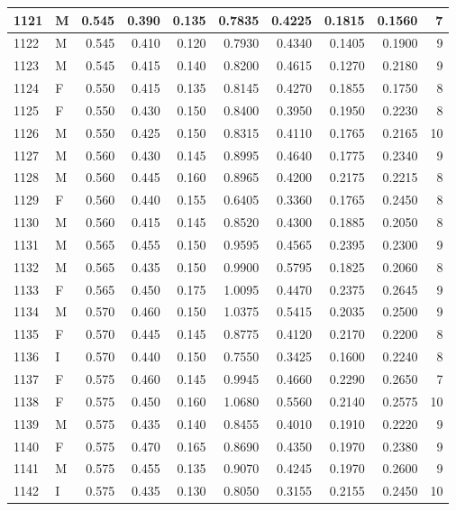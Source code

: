 \documentclass[9pt,twocolumn,twoside,]{pnas-new}
\begin{document}
\begin{tabular}{l|l|r|r|r|r|r|r|r|r}
\hline
1121 & M & 0.545 & 0.390 & 0.135 & 0.7835 & 0.4225 & 0.1815 & 0.1560 & 7\\
\hline
1122 & M & 0.545 & 0.410 & 0.120 & 0.7930 & 0.4340 & 0.1405 & 0.1900 & 9\\
\hline
1123 & M & 0.545 & 0.415 & 0.140 & 0.8200 & 0.4615 & 0.1270 & 0.2180 & 9\\
\hline
1124 & F & 0.550 & 0.415 & 0.135 & 0.8145 & 0.4270 & 0.1855 & 0.1750 & 8\\
\hline
1125 & F & 0.550 & 0.430 & 0.150 & 0.8400 & 0.3950 & 0.1950 & 0.2230 & 8\\
\hline
1126 & M & 0.550 & 0.425 & 0.150 & 0.8315 & 0.4110 & 0.1765 & 0.2165 & 10\\
\hline
1127 & M & 0.560 & 0.430 & 0.145 & 0.8995 & 0.4640 & 0.1775 & 0.2340 & 9\\
\hline
1128 & M & 0.560 & 0.445 & 0.160 & 0.8965 & 0.4200 & 0.2175 & 0.2215 & 8\\
\hline
1129 & F & 0.560 & 0.440 & 0.155 & 0.6405 & 0.3360 & 0.1765 & 0.2450 & 8\\
\hline
1130 & M & 0.560 & 0.415 & 0.145 & 0.8520 & 0.4300 & 0.1885 & 0.2050 & 8\\
\hline
1131 & M & 0.565 & 0.455 & 0.150 & 0.9595 & 0.4565 & 0.2395 & 0.2300 & 9\\
\hline
1132 & M & 0.565 & 0.435 & 0.150 & 0.9900 & 0.5795 & 0.1825 & 0.2060 & 8\\
\hline
1133 & F & 0.565 & 0.450 & 0.175 & 1.0095 & 0.4470 & 0.2375 & 0.2645 & 9\\
\hline
1134 & M & 0.570 & 0.460 & 0.150 & 1.0375 & 0.5415 & 0.2035 & 0.2500 & 9\\
\hline
1135 & F & 0.570 & 0.445 & 0.145 & 0.8775 & 0.4120 & 0.2170 & 0.2200 & 8\\
\hline
1136 & I & 0.570 & 0.440 & 0.150 & 0.7550 & 0.3425 & 0.1600 & 0.2240 & 8\\
\hline
1137 & F & 0.575 & 0.460 & 0.145 & 0.9945 & 0.4660 & 0.2290 & 0.2650 & 7\\
\hline
1138 & F & 0.575 & 0.450 & 0.160 & 1.0680 & 0.5560 & 0.2140 & 0.2575 & 10\\
\hline
1139 & M & 0.575 & 0.435 & 0.140 & 0.8455 & 0.4010 & 0.1910 & 0.2220 & 9\\
\hline
1140 & F & 0.575 & 0.470 & 0.165 & 0.8690 & 0.4350 & 0.1970 & 0.2380 & 9\\
\hline
1141 & M & 0.575 & 0.455 & 0.135 & 0.9070 & 0.4245 & 0.1970 & 0.2600 & 9\\
\hline
1142 & I & 0.575 & 0.435 & 0.130 & 0.8050 & 0.3155 & 0.2155 & 0.2450 & 10\\

\end{tabular}
\end{document}
